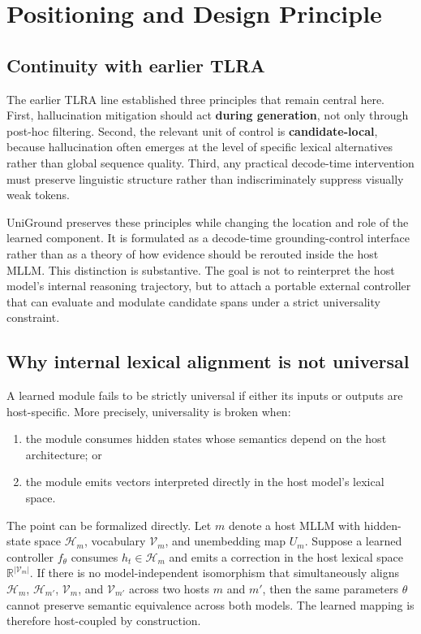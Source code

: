 \section{Positioning and Design Principle}
\label{sec:positioning}

\subsection{Continuity with earlier TLRA}

The earlier TLRA line established three principles that remain central here. First, hallucination mitigation should act \textbf{during generation}, not only through post-hoc filtering. Second, the relevant unit of control is \textbf{candidate-local}, because hallucination often emerges at the level of specific lexical alternatives rather than global sequence quality. Third, any practical decode-time intervention must preserve linguistic structure rather than indiscriminately suppress visually weak tokens.

UniGround preserves these principles while changing the location and role of the learned component. It is formulated as a decode-time grounding-control interface rather than as a theory of how evidence should be rerouted inside the host MLLM. This distinction is substantive. The goal is not to reinterpret the host model's internal reasoning trajectory, but to attach a portable external controller that can evaluate and modulate candidate spans under a strict universality constraint.

\subsection{Why internal lexical alignment is not universal}

A learned module fails to be strictly universal if either its inputs or outputs are host-specific. More precisely, universality is broken when:
\begin{enumerate}
  \item the module consumes hidden states whose semantics depend on the host architecture; or
  \item the module emits vectors interpreted directly in the host model's lexical space.
\end{enumerate}

The point can be formalized directly. Let $m$ denote a host MLLM with hidden-state space $\mathcal{H}_m$, vocabulary $\mathcal{V}_m$, and unembedding map $U_m$. Suppose a learned controller $f_\theta$ consumes $h_t \in \mathcal{H}_m$ and emits a correction in the host lexical space $\mathbb{R}^{|\mathcal{V}_m|}$. If there is no model-independent isomorphism that simultaneously aligns $\mathcal{H}_m$, $\mathcal{H}_{m'}$, $\mathcal{V}_m$, and $\mathcal{V}_{m'}$ across two hosts $m$ and $m'$, then the same parameters $\theta$ cannot preserve semantic equivalence across both models. The learned mapping is therefore host-coupled by construction.

